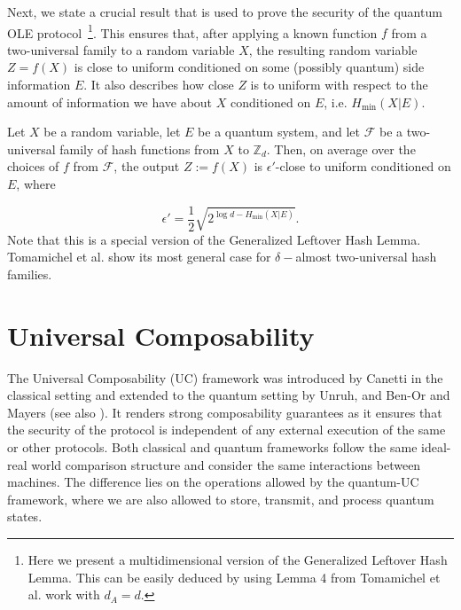 Next, we state a crucial result that is used to prove the security of the quantum OLE protocol~\footnote{Here we present a multidimensional version of the Generalized Leftover Hash Lemma. This can be easily deduced by using Lemma 4 from Tomamichel et al. work \cite{TSSR11} with $d_A = d$.}. This ensures that, after applying a known function $f$ from a two-universal family to a random variable $X$, the resulting random variable $Z = f(X)$ is close to uniform conditioned on some (possibly quantum) side information $E$. It also describes how close $Z$ is to uniform with respect to the amount of information we have about $X$ conditioned on $E$, i.e. $H_\text{min}(X|E)$.

\begin{lemma}
Let $X$ be a random variable, let $E$ be a quantum system, and let $\mathcal{F}$ be a two-universal family of hash functions from $X$ to $\mathbb{Z}_d$. Then, on average over the choices of $f$ from $\mathcal{F}$, the output $Z := f(X)$ is $\epsilon'$-close to uniform conditioned on $E$, where

\begin{equation}
  \epsilon' = \frac{1}{2}\sqrt{2^{\log d - H_\text{min}(X|E)}}.  
\end{equation}
Note that this is a special version of the Generalized Leftover Hash Lemma. Tomamichel et al. \cite{TSSR11} show its most general case for $\delta-$almost two-universal hash families. \label{lem:leftover}
\end{lemma}


\section{Universal Composability}

The Universal Composability (UC) framework was introduced by Canetti \cite{C20} in the classical setting and extended to the quantum setting by Unruh, and Ben-Or and Mayers \cite{Unruh04, BenOrMay04}(see also \cite{Unruh10, FS09}).  It renders strong composability guarantees as it ensures that the security of the protocol is independent of any external execution of the same or other protocols.  Both classical and quantum frameworks follow the same ideal-real world comparison structure and consider the same interactions between machines. The difference lies on the operations allowed by the quantum-UC framework, where  we are also allowed to store, transmit, and process  quantum states. 

